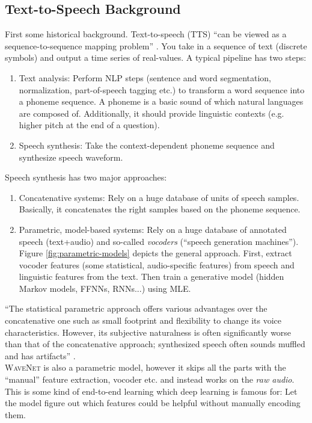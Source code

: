 \subsection{Text-to-Speech Background}
\label{sec:text-to-speech}
First some historical background. Text-to-speech (TTS) \enquote{can be viewed as a sequence-to-sequence mapping problem} \parencite{oord_wavenet:_2016}. You take in a sequence of text (discrete symbols) and output a time series of real-values. A typical pipeline has two steps:
\begin{enumerate}
	\item Text analysis: Perform NLP steps (sentence and word segmentation, normalization, part-of-speech tagging etc.) to transform a word sequence into a phoneme sequence. A phoneme is a basic sound of which natural languages are composed of. Additionally, it should provide linguistic contexts (e.g. higher pitch at the end of a question).
	\item Speech synthesis: Take the context-dependent phoneme sequence and synthesize speech waveform.
\end{enumerate}
Speech synthesis has two major approaches:
\begin{enumerate}
	\item Concatenative systems: Rely on a huge database of units of speech samples. Basically, it concatenates the right samples based on the phoneme sequence.
	\item Parametric, model-based systems: Rely on a huge database of annotated speech (text+audio) and so-called \textit{vocoders} (``speech generation machines''). Figure \ref{fig:parametric-models} depicts the general approach. First, extract vocoder features (some statistical, audio-specific features) from speech and linguistic features from the text. Then train a generative model (hidden Markov models, FFNNs, RNNs...) using MLE.
\end{enumerate}
\enquote{The statistical parametric approach offers various advantages over the concatenative one such as small footprint and flexibility to change its voice characteristics. However, its subjective naturalness is often significantly worse than that of the concatenative approach; synthesized speech often sounds muffled and has artifacts} \parencite{oord_wavenet:_2016}.\\
\textsc{WaveNet} is also a parametric model, however it skips all the parts with the ``manual'' feature extraction, vocoder etc. and instead works on the \textit{raw audio}. This is some kind of end-to-end learning which deep learning is famous for: Let the model figure out which features could be helpful without manually encoding them.

